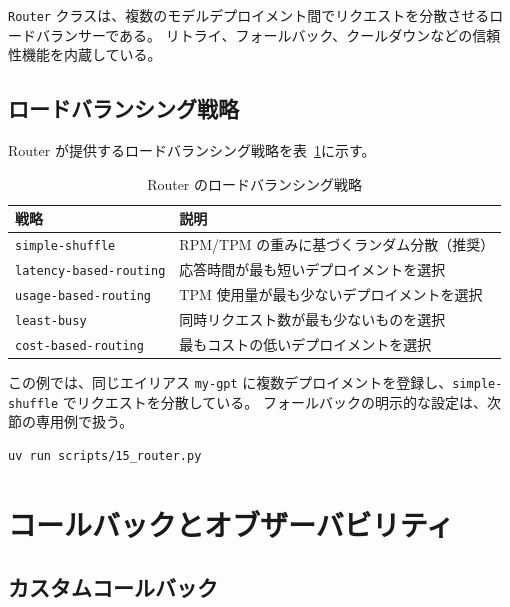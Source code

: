 \documentclass[a4paper,11pt]{ltjsarticle}
\newcommand{\code}[1]{\texttt{#1}}
\begin{document}
\code{Router} クラスは、複数のモデルデプロイメント間でリクエストを分散させるロードバランサーである。
リトライ、フォールバック、クールダウンなどの信頼性機能を内蔵している。

\subsection{ロードバランシング戦略}

Router が提供するロードバランシング戦略を表~\ref{tab:routing}に示す。

\begin{table}[htbp]
\centering
\caption{Router のロードバランシング戦略}
\label{tab:routing}
\begin{tabular}{lp{8cm}}
\toprule
戦略 & 説明 \\
\midrule
\code{simple-shuffle} & RPM/TPM の重みに基づくランダム分散（推奨） \\
\code{latency-based-routing} & 応答時間が最も短いデプロイメントを選択 \\
\code{usage-based-routing}   & TPM 使用量が最も少ないデプロイメントを選択 \\
\code{least-busy}            & 同時リクエスト数が最も少ないものを選択 \\
\code{cost-based-routing}    & 最もコストの低いデプロイメントを選択 \\
\bottomrule
\end{tabular}
\end{table}



この例では、同じエイリアス \code{my-gpt} に複数デプロイメントを登録し、\code{simple-shuffle} でリクエストを分散している。
フォールバックの明示的な設定は、次節の専用例で扱う。

\begin{lstlisting}[style=bash]
uv run scripts/15_router.py
\end{lstlisting}


\section{コールバックとオブザーバビリティ}
\label{sec:callbacks}

\subsection{カスタムコールバック}
\label{subsec:custom_callback}
\end{document}
